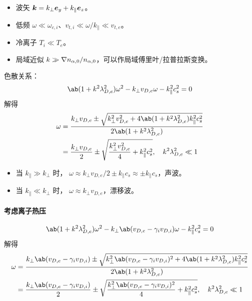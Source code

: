 \begin{itemize}
    \item 波矢 $\bm{k} = k_\perp \bm{e}_y + k_\parallel \bm{e}_z$。
    \item 低频 $\omega \ll \omega_{c,i}$、$v_{t,i} \ll \omega / k_\parallel \ll v_{t,e}$。
    \item 冷离子 $T_i \ll T_e$。
    \item 局域近似 $k \gg \nabla {n_{\alpha,0}}/n_{\alpha,0}$，可以作局域傅里叶/拉普拉斯变换。
\end{itemize}

色散关系：
\begin{equation}
\ab(1 + k^2 \lambda_{D,e}^2) \omega^2 - k_\perp v_{D,e} \omega - k_\parallel^2 c_s^2 = 0
\end{equation}
解得
\begin{equation}\begin{aligned}
\omega &= \frac{
    k_\perp v_{D,e} \pm \sqrt{k_\perp^2 v_{D,e}^2
    + 4 \ab(1 + k^2 \lambda_{D,e}^2) k_\parallel^2 c_s^2}
}{
    2 \ab(1 + k^2 \lambda_{D,e}^2)
} \\
&= \frac{k_\perp v_{D,e}}{2} \pm \sqrt{\frac{k_\perp^2 v_{D,e}^2}{4}
    + k_\parallel^2 c_s^2}, \quad k^2 \lambda_{D,e}^2 \ll 1
\end{aligned}\end{equation}

\begin{itemize}
    \item 当 $k_\parallel \gg k_\perp$ 时，
    $\omega \approx k_\perp v_{D,e}/2 \pm k_\parallel c_s \approx \pm k_\parallel c_s$，声波。
    \item 当 $k_\parallel \ll k_\perp$ 时，
    $\omega \approx k_\perp v_{D,e}$，漂移波。
\end{itemize}

\paragraph{考虑离子热压}
\begin{equation}
\ab(1 + k^2 \lambda_{D,e}^2) \omega^2
- k_\perp \ab(v_{D,e} - \gamma_i v_{D,i}) \omega
- k_\parallel^2 c_s^2 = 0
\end{equation}
解得
\begin{equation}\begin{aligned}
\omega &= \frac{
    k_\perp \ab(v_{D,e} - \gamma_i v_{D,i}) \pm \sqrt{k_\perp^2 \ab(v_{D,e} - \gamma_i v_{D,i})^2
    + 4 \ab(1 + k^2 \lambda_{D,e}^2) k_\parallel^2 c_s^2}
}{
    2 \ab(1 + k^2 \lambda_{D,e}^2)
} \\
&= \frac{k_\perp \ab(v_{D,e} - \gamma_i v_{D,i})}{2} \pm \sqrt{\frac{k_\perp^2 \ab(v_{D,e} - \gamma_i v_{D,i})^2}{4}
    + k_\parallel^2 c_s^2}, \quad k^2 \lambda_{D,e}^2 \ll 1
\end{aligned}\end{equation}

